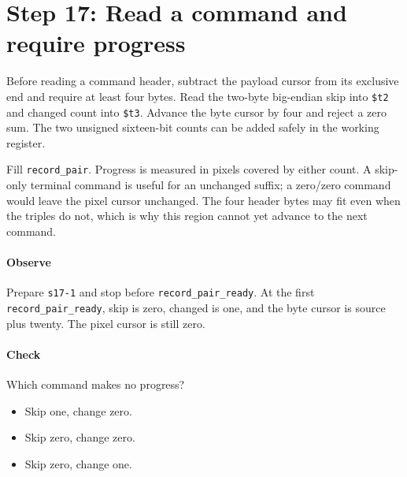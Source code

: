 \section{Step 17: Read a command and require progress}
Before reading a command header, subtract the payload cursor from its
exclusive end and require at least four bytes. Read the two-byte big-endian skip
into \texttt{\$t2} and changed count into \texttt{\$t3}. Advance the byte
cursor by four and reject a zero sum. The two unsigned sixteen-bit counts can
be added safely in the working register.

Fill \texttt{record\_pair}. Progress is measured in pixels covered by either
count. A skip-only terminal command is useful for an unchanged suffix; a
zero/zero command would leave the pixel cursor unchanged. The four header bytes
may fit even when the triples do not, which is why this region cannot yet
advance to the next command.

\paragraph{Observe} Prepare \texttt{s17-1} and stop before
\texttt{record\_pair\_ready}. At the first \texttt{record\_pair\_ready}, skip is zero,
changed is one, and the byte cursor is source plus twenty. The pixel cursor
is still zero.

\paragraph{Check} Which command makes no progress?
\begin{itemize}
  \item[A.] Skip one, change zero.
  \item[B.] Skip zero, change zero.
  \item[C.] Skip zero, change one.
\end{itemize}
